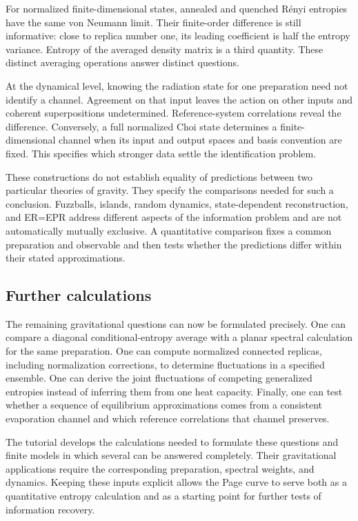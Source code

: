 \documentclass[11pt,letterpaper]{article}
\theoremstyle{plain}
\theoremstyle{definition}
\theoremstyle{remark}
\begin{document}
For normalized finite-dimensional states, annealed and quenched R\'enyi
entropies have the same von Neumann limit. Their finite-order difference is
still informative: close to replica number one, its leading coefficient is
half the entropy variance. Entropy of the averaged density matrix is a
third quantity. These distinct averaging operations answer distinct questions.

At the dynamical level, knowing the radiation state for one preparation
need not identify a channel. Agreement on that input leaves the action on
other inputs and coherent superpositions undetermined. Reference-system
correlations reveal the difference. Conversely, a full normalized Choi state
determines a finite-dimensional channel when its input and output spaces
and basis convention are fixed. This specifies which stronger data settle
the identification problem.

These constructions do not establish equality of predictions between two
particular theories of gravity. They specify the comparisons needed for
such a conclusion. Fuzzballs, islands, random dynamics, state-dependent
reconstruction, and ER=EPR address different aspects of the information
problem and are not automatically mutually exclusive. A quantitative
comparison fixes a common preparation and observable and then tests whether
the predictions differ within their stated approximations.

\subsection{Further calculations}
\label{subsec15:outlook}

The remaining gravitational questions can now be formulated precisely.
One can compare a diagonal conditional-entropy average with a planar
spectral calculation for the same preparation. One can compute normalized
connected replicas, including normalization corrections, to determine
fluctuations in a specified ensemble. One can derive the joint
fluctuations of competing generalized entropies instead of inferring them
from one heat capacity. Finally, one can test whether a sequence of
equilibrium approximations comes from a consistent evaporation channel
and which reference correlations that channel preserves.

The tutorial develops the calculations needed to formulate these questions
and finite models in which several can be answered completely. Their
gravitational applications require the corresponding preparation, spectral
weights, and dynamics. Keeping these inputs explicit allows the Page curve
to serve both as a quantitative entropy calculation and as a starting point
for further tests of information recovery.
\end{document}
